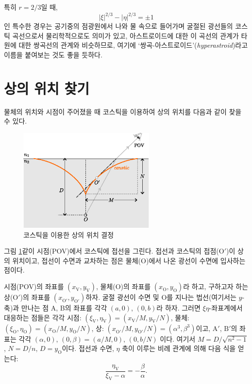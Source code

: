 \documentclass[twocolumn]{article}
\begin{document}
특히 $r = 2/3$일 때,
$$ \left| \xi \right|^{2/3} - \left| \eta \right|^{2/3} = \pm1 $$
인 특수한 경우는 공기중의 점광원에서 나와 물 속으로 들어가며 굴절된 광선들의 코스틱 곡선으로서 
물리학적으로도 의미가 있고, 아스트로이드에 대한 이 곡선의 관계가 타원에 대한 쌍곡선의 관계와 
비슷하므로, 여기에 `쌍곡-아스트로이드'(\emph{hyperastroid})라고 이름을 붙여보는 것도 좋을 듯하다. 

\section{상의 위치 찾기}
물체의 위치와 시점이 주어졌을 때 코스틱을 이용하여 상의 위치를 다음과 같이 찾을 수 있다.

\begin{figure}[!h]
	\centering
	\includegraphics[width=2.7in]{figs/g394.eps}
	\caption{코스틱을 이용한 상의 위치 결정}
	\label{fig:image_caustic}
\end{figure}

그림 \ref{fig:image_caustic}\와 같이 시점(POV)에서 코스틱에 접선을 그린다. 접선과 코스틱의 접점($\mathrm{O'}$)이 상의 위치이고, 접선이 수면과 
교차하는 점은 물체($\mathrm{O}$)에서 나온 광선이 수면에 입사하는 점이다.

시점(POV)의 좌표를 $(x_{\mathrm{V}}^{}, y_{\mathrm{V}}^{})$, 물체($\mathrm{O}$)의 좌표를 $(x_{\mathrm{O}}^{}, y_{\mathrm{O}}^{})$라 하고, 구하고자 하는 상($\mathrm{O'}$)의 좌표를 $(x_{\mathrm{O'}}^{}, y_{\mathrm{O'}}^{})$\라 하자. 굴절 광선이 수면 및 $\mathrm{O}$를 지나는 법선(여기서는 $y$-축)과 만나는 점 A, B의 좌표를 각각 $(a, 0)$, $(0, b)$라 하자. 그러면 $\xi\eta$-좌표계에서 대응하는 점들은 각각 시점: $(\xi_{\mathrm{V}}^{}, \eta_{\mathrm{V}}^{})=(x_{\mathrm{V}}^{}/M, y_{\mathrm{V}}^{}/N)$, 물체: $(\xi_{\mathrm{O}}^{}, \eta_{\mathrm{O}}^{})=(x_{\mathrm{O}}^{}/M, y_{\mathrm{O}}^{}/N)$, 상: $(x_{\mathrm{O'}}^{}/M, y_{\mathrm{O'}}^{}/N)=(\alpha^3, \beta^3)$이고, $\mathrm{A'}$, $\mathrm{B'}$의 좌표는 각각 $(\alpha, 0)$, $(0, \beta)=(a/M, 0)$, $(0, b/N)$ 이다. 여기서 $M=D/\sqrt{n^2-1}$, $N=D/n$, $D=y_{\mathrm{O}}^{}$이다. 접선과 수면, $\eta$ 축이 이루는 비례 관계에 의해 다음 식을 얻는다:
$$\dfrac{\eta_{\mathrm{V}}^{}}{\xi_{\mathrm{V}}^{}-\alpha}=-\dfrac{\beta}{\alpha}.$$
\end{document}

